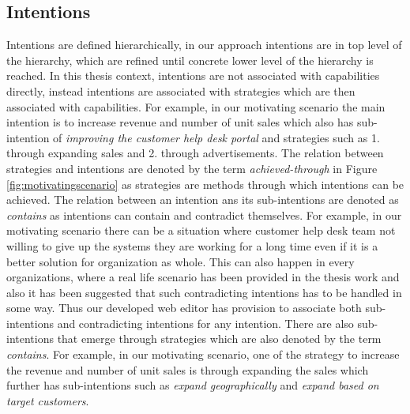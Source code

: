 \subsection{Intentions} 
\label{sec:intentions}
Intentions are defined hierarchically, in our approach intentions are in top level of the hierarchy, which are refined until concrete lower level of the hierarchy is reached. In this thesis context, intentions are not associated with capabilities directly, instead intentions are associated with strategies which are then associated with capabilities. For example, in our motivating scenario the main intention is to increase revenue and number of unit sales which also has sub-intention of \textit{improving the customer help desk portal} and strategies such as 1. through expanding sales and 2. through advertisements. The relation between strategies and intentions are denoted by the term \textit{achieved-through} in Figure \ref{fig:motivatingscenario} as strategies are methods through which intentions can be achieved. The relation between an intention ans its sub-intentions are denoted as \textit{contains} as intentions can contain and contradict themselves. For example, in our motivating scenario there can be a situation where customer help desk team not willing to give up the systems they are working for a long time even if it is a better solution for organization as whole. This can also happen in every organizations, where a real life scenario has been provided in the thesis work \cite{Sierr2015} and also it has been suggested that such contradicting intentions has to be handled in some way. Thus our developed web editor has provision to associate both sub-intentions and contradicting intentions for any intention. There are also sub-intentions that emerge through strategies which are also denoted by the term \textit{contains}. For example, in our motivating scenario, one of the strategy to increase the revenue and number of unit sales is through expanding the sales which further has sub-intentions such as \textit{expand geographically} and \textit{expand based on target customers}. 

